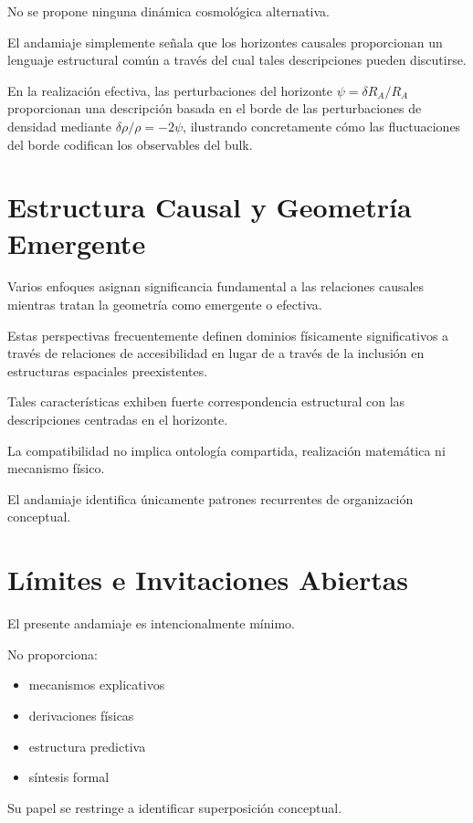 \documentclass[12pt,a4paper]{article}
\begin{document}
No se propone ninguna dinámica cosmológica alternativa.

El andamiaje simplemente señala que los horizontes causales proporcionan un lenguaje estructural común a través del cual tales descripciones pueden discutirse.

En la realización efectiva, las perturbaciones del horizonte $\psi = \delta R_A / R_A$ proporcionan una descripción basada en el borde de las perturbaciones de densidad mediante $\delta\rho/\rho = -2\psi$, ilustrando concretamente cómo las fluctuaciones del borde codifican los observables del bulk.

\section{Estructura Causal y Geometría Emergente}

Varios enfoques asignan significancia fundamental a las relaciones causales mientras tratan la geometría como emergente o efectiva.

Estas perspectivas frecuentemente definen dominios físicamente significativos a través de relaciones de accesibilidad en lugar de a través de la inclusión en estructuras espaciales preexistentes.

Tales características exhiben fuerte correspondencia estructural con las descripciones centradas en el horizonte.

La compatibilidad no implica ontología compartida, realización matemática ni mecanismo físico.

El andamiaje identifica únicamente patrones recurrentes de organización conceptual.

\section{Límites e Invitaciones Abiertas}

El presente andamiaje es intencionalmente mínimo.

No proporciona:

\begin{itemize}
  \item mecanismos explicativos
  \item derivaciones físicas
  \item estructura predictiva
  \item síntesis formal
\end{itemize}

Su papel se restringe a identificar superposición conceptual.
\end{document}
